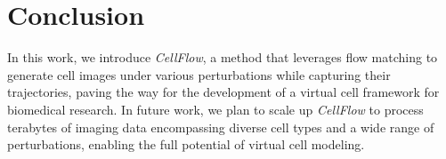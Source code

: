 \section{Conclusion}
\label{sec:conclusion}

In this work, we introduce \emph{CellFlow}, a method that leverages flow matching to generate cell images under various perturbations while capturing their trajectories, paving the way for the development of a virtual cell framework for biomedical research. In future work, we plan to scale up \emph{CellFlow} to process terabytes of imaging data encompassing diverse cell types and a wide range of perturbations, enabling the full potential of virtual cell modeling.
